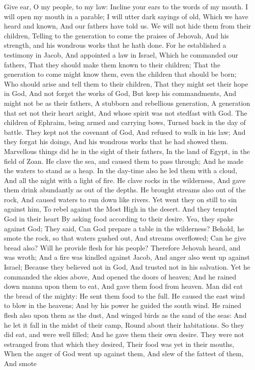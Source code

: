 Give ear, O my people, to my law: Incline your ears to the words of my mouth.  I will open my mouth in a parable; I will utter dark sayings of old,  Which we have heard and known, And our fathers have told us.  We will not hide them from their children, Telling to the generation to come the praises of Jehovah, And his strength, and his wondrous works that he hath done.  For he established a testimony in Jacob, And appointed a law in Israel, Which he commanded our fathers, That they should make them known to their children;  That the generation to come might know them, even the children that should be born; Who should arise and tell them to their children,  That they might set their hope in God, And not forget the works of God, But keep his commandments,  And might not be as their fathers, A stubborn and rebellious generation, A generation that set not their heart aright, And whose spirit was not stedfast with God.  The children of Ephraim, being armed and carrying bows, Turned back in the day of battle.  They kept not the covenant of God, And refused to walk in his law;  And they forgat his doings, And his wondrous works that he had showed them.  Marvellous things did he in the sight of their fathers, In the land of Egypt, in the field of Zoan.  He clave the sea, and caused them to pass through; And he made the waters to stand as a heap.  In the day-time also he led them with a cloud, And all the night with a light of fire.  He clave rocks in the wilderness, And gave them drink abundantly as out of the depths.  He brought streams also out of the rock, And caused waters to run down like rivers.  Yet went they on still to sin against him, To rebel against the Most High in the desert.  And they tempted God in their heart By asking food according to their desire.  Yea, they spake against God; They said, Can God prepare a table in the wilderness?  Behold, he smote the rock, so that waters gushed out, And streams overflowed; Can he give bread also? Will he provide flesh for his people?  Therefore Jehovah heard, and was wroth; And a fire was kindled against Jacob, And anger also went up against Israel;  Because they believed not in God, And trusted not in his salvation.  Yet he commanded the skies above, And opened the doors of heaven;  And he rained down manna upon them to eat, And gave them food from heaven.  Man did eat the bread of the mighty: He sent them food to the full.  He caused the east wind to blow in the heavens; And by his power he guided the south wind.  He rained flesh also upon them as the dust, And winged birds as the sand of the seas:  And he let it fall in the midst of their camp, Round about their habitations.  So they did eat, and were well filled; And he gave them their own desire.  They were not estranged from that which they desired, Their food was yet in their mouths,  When the anger of God went up against them, And slew of the fattest of them, And smote 